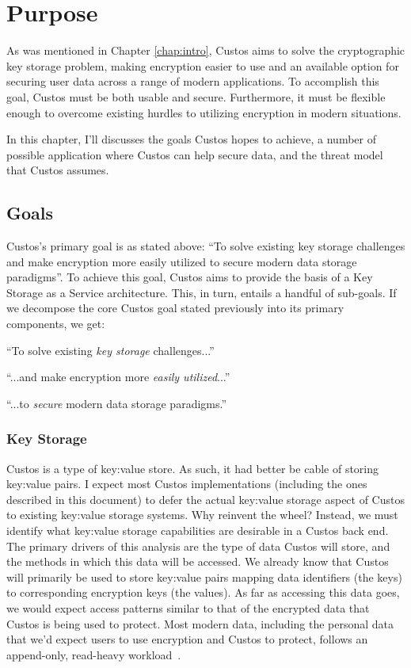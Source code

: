 \chapter{Purpose}
\label{chap:purpose}

As was mentioned in Chapter \ref{chap:intro}, Custos aims to solve the
cryptographic key storage problem, making encryption easier to use and
an available option for securing user data across a range of modern
applications. To accomplish this goal, Custos must be both usable and
secure.  Furthermore, it must be flexible enough to overcome existing
hurdles to utilizing encryption in modern situations.

In this chapter, I'll discusses the goals Custos hopes to achieve, a
number of possible application where Custos can help secure data, and
the threat model that Custos assumes.

\section{Goals}

Custos's primary goal is as stated above: ``To solve existing key
storage challenges and make encryption more easily utilized to secure
modern data storage paradigms''. To achieve this goal, Custos aims
to provide the basis of a Key Storage as a Service architecture. This,
in turn, entails a handful of sub-goals. If we decompose the core
Custos goal stated previously into its primary components, we get:

\begin{packed_desc}
\item[Provide Key Storage:] ``To solve existing \emph{key storage}
  challenges...''
\item[Easily Usable:] ``...and make encryption more \emph{easily
  utilized}...''
\item[Secure:] ``...to \emph{secure} modern data storage paradigms.''
\end{packed_desc}

\subsection{Key Storage}

Custos is a type of key:value store. As such, it had better be cable
of storing key:value pairs. I expect most Custos implementations
(including the ones described in this document) to defer the actual
key:value storage aspect of Custos to existing key:value storage
systems. Why reinvent the wheel? Instead, we must identify what
key:value storage capabilities are desirable in a Custos back end. The
primary drivers of this analysis are the type of data Custos will
store, and the methods in which this data will be accessed. We already
know that Custos will primarily be used to store key:value pairs
mapping data identifiers (the keys) to corresponding encryption keys
(the values). As far as accessing this data goes, we would expect
access patterns similar to that of the encrypted data that Custos is
being used to protect. Most modern data, including the personal data
that we'd expect users to use encryption and Custos to protect,
follows an append-only, read-heavy workload~\cite{Ghemawat2003}.


